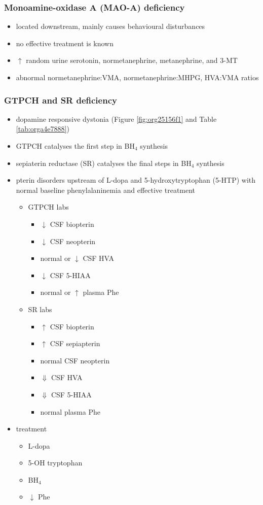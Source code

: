 \documentclass{scrartcl}
\begin{document}
\subsubsection{Monoamine-oxidase A (MAO-A) deficiency}
\label{sec:org5a5beef}
\begin{itemize}
\item located downstream, mainly causes behavioural disturbances
\item no effective treatment is known
\item \(\uparrow\) random urine serotonin, normetanephrine, metanephrine, and 3-MT
\item abnormal normetanephrine:VMA, normetanephrine:MHPG, HVA:VMA ratios
\end{itemize}
\subsubsection{GTPCH and SR deficiency}
\label{sec:org61ecc0f}
\begin{itemize}
\item dopamine responsive dystonia (Figure \ref{fig:org25156f1} and Table \ref{tab:orga4e7888})
\item GTPCH catalyses the first step in BH\(_{\text{4}}\) synthesis
\item sepiaterin reductase (SR) catalyses the final steps in BH\(_{\text{4}}\) synthesis
\item pterin disorders upstream of L-dopa and 5-hydroxytryptophan
(5-HTP) with normal baseline phenylalaninemia and effective
treatment
\begin{itemize}
\item GTPCH labs
\begin{itemize}
\item \(\downarrow\) CSF biopterin
\item \(\downarrow\) CSF neopterin
\item normal or \(\downarrow\) CSF HVA
\item \(\downarrow\) CSF 5-HIAA
\item normal or \(\uparrow\) plasma Phe
\end{itemize}
\item SR labs
\begin{itemize}
\item \(\uparrow\) CSF biopterin
\item \(\uparrow\) CSF sepiapterin
\item normal CSF neopterin
\item \(\Downarrow\) CSF HVA
\item \(\Downarrow\) CSF 5-HIAA
\item normal plasma Phe
\end{itemize}
\end{itemize}
\item treatment
\begin{itemize}
\item L-dopa
\item 5-OH tryptophan
\item BH\(_{\text{4}}\)
\item \(\downarrow\) Phe
\end{itemize}
\end{itemize}
\end{document}
